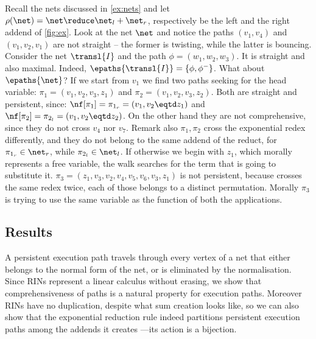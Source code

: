 \begin{example}\label{ex:path}
Recall the nets discussed in \autoref{ex:nets} and let
  $\rho(\net) = \net \reduce \net_l + \net_r$,
respectively be the left and the right addend of \autoref{fig:ex}.
Look at the net $\net $ and notice the paths $(v_1,v_4)$ and $(v_1,v_2,v_1)$ 
are not straight -- the former is twisting, while the latter is bouncing.
Consider the net $\transl{I}$ and the path $\phi = (w_1,w_2,w_3)$.
It is straight and also maximal.
Indeed, $\epaths{\transl{I}} = \lbrace \phi, \phi^- \rbrace$.
What about $\epaths{\net}$?
If we start from $v_1$ we find two paths seeking for the head variable:
  $\pi_1 = (v_1, v_2, v_3, z_1)$ and
  $\pi_2 = (v_1, v_2, v_3, z_2)$.
Both are straight and persistent, since:
  $\nf[\pi_1] = \pi_{1_r} = (v_1, v_2 \eqtd z_1)$ and
  $\nf[\pi_2] = \pi_{2_l} = (v_1, v_2 \eqtd z_2)$.
On the other hand they are not comprehensive, since they do not cross $v_4$ nor 
$v_7$.
Remark also $\pi_1,\pi_2$ cross the exponential redex differently,
and they do not belong to the same addend of the reduct,
for $\pi_{1_r} \in \net_r$, while $\pi_{2_l} \in \net_l$.
If otherwise we begin with $z_1$, which morally represents a free variable, 
the walk searches for the term that is going to substitute it.
$\pi_3 = (z_1, v_3, v_2, v_4, v_5, v_6, v_3, z_1)$
is not persistent, because crosses the same redex twice, each of those belongs 
to a distinct permutation.
Morally $\pi_3$ is trying to use the same variable as the function of both 
the applications.
\end{example}

\subsection{Results}

A persistent execution path travels through every vertex of a net that either 
belongs to the normal form of the net, or is eliminated by the normalisation.
Since RINs represent a linear calculus without erasing, we show that 
comprehensiveness of paths is a natural property for execution paths.
Moreover RINs have no duplication, despite what sum creation looks like,
so we can also show that the exponential reduction rule indeed partitions 
persistent execution paths among the addends it creates ---its action is a 
bijection.

